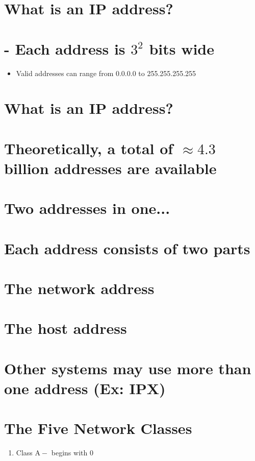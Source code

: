 \documentclass[10pt]{article}
\begin{document}
\section*{What is an IP address? }
\section{- Each address is $3^{2}$ bits wide}
\begin{itemize}
  \item Valid addresses can range from 0.0.0.0 to 255.255.255.255
\end{itemize}



\section*{What is an IP address? }
\section{Theoretically, a total of $\approx 4.3$ billion addresses are available}


\section{Two addresses in one...}
\section{Each address consists of two parts}
\section{The network address}
\section{The host address}
\section{Other systems may use more than one address (Ex: IPX)}
\section{The Five Network Classes}
\begin{enumerate}
  \item Class $\mathrm{A}-$ begins with 0
\end{enumerate}
\end{document}
